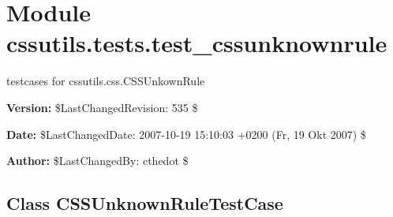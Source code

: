 %
%
%


\section{Module cssutils.tests.test\_cssunknownrule}

    \label{cssutils:tests:test_cssunknownrule}
testcases for cssutils.css.CSSUnkownRule

\textbf{Version:} \$LastChangedRevision: 535 \$



\textbf{Date:} \$LastChangedDate: 2007-10-19 15:10:03 +0200 (Fr, 19 Okt 2007) \$



\textbf{Author:} \$LastChangedBy: cthedot \$





\subsection{Class CSSUnknownRuleTestCase}

